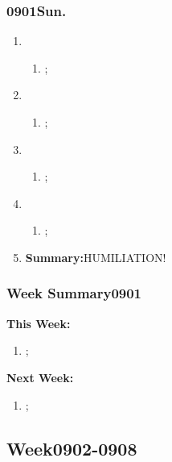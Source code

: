 \subsubsection{0901Sun.}
\begin{enumerate}
	\item \ncquaone
	\begin{enumerate}[(1)]
		\item;\rightundoneBlack
	\end{enumerate}
	
	\item \ncquatwo	
	\begin{enumerate}[(1)]
		\item ;\rightundone
	\end{enumerate}
	
	\item \ncquathree
	\begin{enumerate}[(1)]
		\item ;\rightundone
	\end{enumerate}
	
	\item \ncquafour	
	\begin{enumerate}[(1)]
		\item ;\rightundoneBlack
	\end{enumerate}
	\item \textbf{Summary:}HUMILIATION! 
\end{enumerate}
\subsubsection{Week Summary0901}	 
{\setlength{\parindent}{0pt}\textbf{This Week:}}
\begin{enumerate}
	\item ;
\end{enumerate}
\textbf{Next Week:}
\begin{enumerate}
	\item ;	
\end{enumerate}
\subsection{Week0902-0908} 
